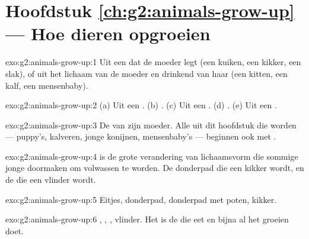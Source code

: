 \section*{Hoofdstuk \ref{ch:g2:animals-grow-up} --- Hoe dieren opgroeien}

\begin{solution}{exo:g2:animals-grow-up:1}
Uit een  dat de moeder legt (een kuiken, een kikker, een slak), of
 uit het lichaam van de moeder en drinkend van haar 
(een kitten, een kalf, een mensenbaby).
\end{solution}

\begin{solution}{exo:g2:animals-grow-up:2}
(a) Uit een . (b) . (c) Uit een . (d) .
(e) Uit een .
\end{solution}

\begin{solution}{exo:g2:animals-grow-up:3}
De  van zijn moeder. Alle  uit dit hoofdstuk die  worden --- puppy's, kalveren, jonge konijnen, mensenbaby's ---
beginnen ook met .
\end{solution}

\begin{solution}{exo:g2:animals-grow-up:4}
 is de grote verandering van lichaamsvorm die
sommige jonge  doormaken om volwassen te worden. De donderpad die
een kikker wordt, en de  die een vlinder wordt.
\end{solution}

\begin{solution}{exo:g2:animals-grow-up:5}
Eitjes, donderpad, donderpad met poten, kikker.
\end{solution}

\begin{solution}{exo:g2:animals-grow-up:6}
, , , vlinder. Het is de  die  eet en bijna al het
groeien doet.
\end{solution}

